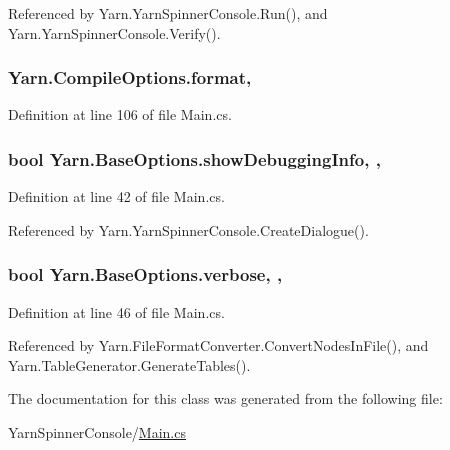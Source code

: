 Referenced by Yarn.\-Yarn\-Spinner\-Console.\-Run(), and Yarn.\-Yarn\-Spinner\-Console.\-Verify().

\hypertarget{a00052_a9904ccfb1b0ff64df415c4fc9fe6eb1c}{
\subsubsection[{format}]{ Yarn.\-Compile\-Options.\-format\hspace{0.3cm}{\ttfamily [get]}, {\ttfamily [set]}}}\label{a00052_a9904ccfb1b0ff64df415c4fc9fe6eb1c}


Definition at line 106 of file Main.\-cs.

\hypertarget{a00040_a89964ea17bd19caf00cb5bff563ed01c}{
\subsubsection[{show\-Debugging\-Info}]{\setlength{\rightskip}{0pt plus 5cm}bool Yarn.\-Base\-Options.\-show\-Debugging\-Info\hspace{0.3cm}{\ttfamily [get]}, {\ttfamily [set]}, {\ttfamily [inherited]}}}\label{a00040_a89964ea17bd19caf00cb5bff563ed01c}


Definition at line 42 of file Main.\-cs.



Referenced by Yarn.\-Yarn\-Spinner\-Console.\-Create\-Dialogue().

\hypertarget{a00040_ada4d83d1756918f362d55f6649b82b17}{
\subsubsection[{verbose}]{\setlength{\rightskip}{0pt plus 5cm}bool Yarn.\-Base\-Options.\-verbose\hspace{0.3cm}{\ttfamily [get]}, {\ttfamily [set]}, {\ttfamily [inherited]}}}\label{a00040_ada4d83d1756918f362d55f6649b82b17}


Definition at line 46 of file Main.\-cs.



Referenced by Yarn.\-File\-Format\-Converter.\-Convert\-Nodes\-In\-File(), and Yarn.\-Table\-Generator.\-Generate\-Tables().



The documentation for this class was generated from the following file\-:\begin{DoxyCompactItemize}
\item 
Yarn\-Spinner\-Console/\hyperlink{a00300}{Main.\-cs}\end{DoxyCompactItemize}
